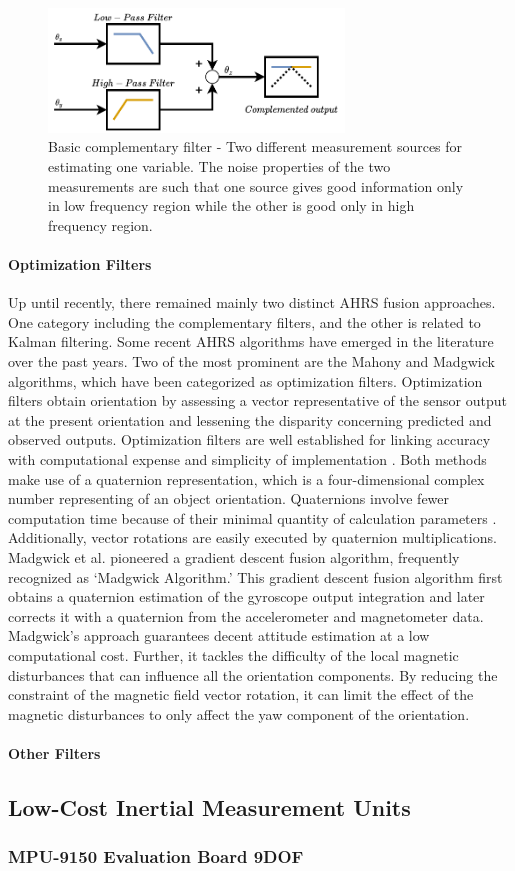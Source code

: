 \begin{figure}[!h]
    \centering
    \includegraphics[width=0.7\textwidth]{figures/complementary.pdf}
    \caption{Basic complementary filter \cite{higgins1975comparison} - Two different measurement sources for estimating one variable. The noise properties of the two measurements are such that one source gives good information only in low frequency region while the other is good only in high frequency region. }
    \label{fig:complementary}
\end{figure}

\paragraph{Optimization Filters}
Up until recently, there remained mainly two distinct AHRS fusion approaches. One category including the complementary filters, and the other is related to Kalman filtering. Some recent AHRS algorithms have emerged in the literature over the past years. Two of the most prominent are the Mahony and Madgwick algorithms, which have been categorized as optimization filters. Optimization filters obtain orientation by assessing a vector representative of the sensor output at the present orientation and lessening the disparity concerning predicted and observed outputs. Optimization filters are well established for linking accuracy with computational expense and simplicity of implementation \cite{madgwick2020extended}.
Both methods make use of a quaternion representation, which is a four-dimensional complex number representing of an object orientation. Quaternions involve fewer computation time because of their minimal quantity of calculation parameters \cite{ludwig2018comparison}. Additionally, vector rotations are easily executed by quaternion multiplications.
Madgwick et al. \cite{madgwick2010efficient} pioneered a gradient descent fusion algorithm, frequently recognized as ‘Madgwick Algorithm.’ This gradient descent fusion algorithm first obtains a quaternion estimation of the gyroscope output integration and later corrects it with a quaternion from the accelerometer and magnetometer data. Madgwick’s approach guarantees decent attitude estimation at a low computational cost. Further, it tackles the difficulty of the local magnetic disturbances that can influence all the orientation components. By reducing the constraint of the magnetic field vector rotation, it can limit the effect of the magnetic disturbances to only affect the yaw component of the orientation.

\paragraph{Other Filters}
\subsection{Low-Cost Inertial Measurement Units}
\subsubsection{MPU-9150 Evaluation Board 9DOF}